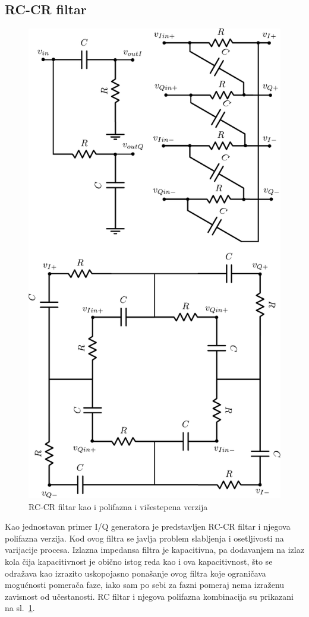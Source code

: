 \documentclass[journal,twocolumn,letterpaper]{IEEEJERM}
\begin{document}
\subsection{RC-CR filtar}

\begin{figure}[!htbp]
  \centering
  \includegraphics[width=0.8\linewidth]{rc_cr_single_multistage.pdf}
  \caption{RC-CR filtar kao i polifazna i višestepena verzija}
  \label{fig:rc_rc_single}
\end{figure}

Kao jednostavan primer I/Q generatora je predstavljen RC-CR filtar i njegova polifazna verzija. Kod ovog filtra se javlja problem slabljenja i osetljivosti na varijacije procesa. Izlazna impedansa filtra je kapacitivna, pa dodavanjem na izlaz kola čija kapacitivnost je obično istog reda kao i ova kapacitivnost, što se odražava kao izrazito uskopojasno ponašanje ovog filtra koje ograničava mogućnosti pomerača faze, iako sam po sebi za fazni pomeraj nema izraženu zavisnost od učestanosti. RC filtar i njegova polifazna kombinacija su prikazani na sl.~\ref{fig:rc_rc_single}.
\end{document}
